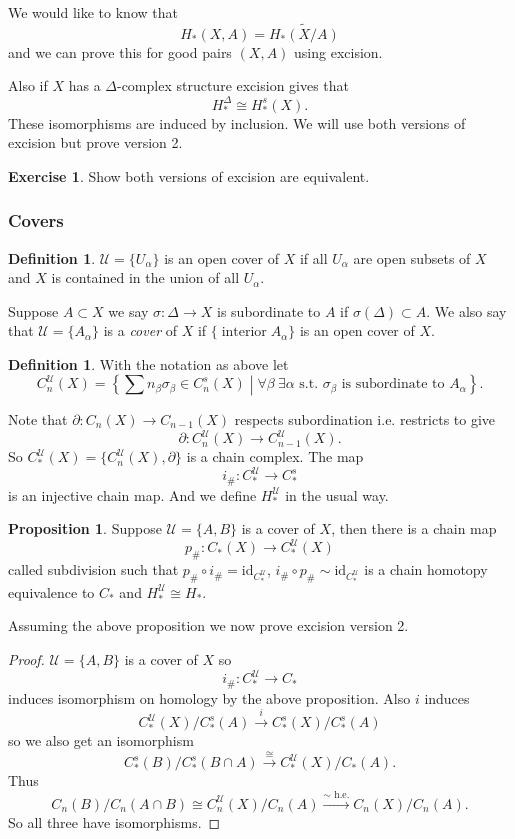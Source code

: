 \documentclass[12pt]{article}
\theoremstyle{definition}
\newtheorem{prop}[thm]{Proposition}
\theoremstyle{definition}
\newtheorem{defn}[thm]{Definition}
\newtheorem*{exer}{Exercise}
\newcommand{\C}{C_*}
\newcommand{\U}{\mathcal{U}}
\renewcommand{\H}{H_*}
\begin{document}
We would like to know that
\[
\H(X,A) = \tilde{\H(X/A)}
\]
and we can prove this for good pairs $(X,A)$ using excision.

Also if $X$ has a $\Delta$-complex structure excision gives that
\[
\H^\Delta \cong \H^s(X).
\]
These isomorphisms are induced by inclusion.
We will use both versions of excision but prove version 2.
\begin{exer}
Show both versions of excision are equivalent.
\end{exer}

\subsubsection{Covers}
\begin{defn}
$\U = \{U_\alpha\}$ is an open cover of $X$ if all $U_\alpha$ are open subsets of $X$ and $X$ is contained in the union of all $U_\alpha$.
\end{defn}

Suppose $A\subset X$ we say $\sigma\colon \Delta \to X$ is subordinate to $A$ if $\sigma(\Delta) \subset A$.
We also say that $\U = \{A_\alpha\}$ is a \emph{cover} of $X$ if $\{\operatorname{interior}A_\alpha\}$ is an open cover of $X$.

\begin{defn}
With the notation as above let
\[
C_n^\U(X) = \left\{ \sum n_\beta \sigma_\beta \in C_n^s(X) \middle| \forall \beta\ \exists \alpha \text{ s.t. } \sigma_\beta \text{ is subordinate to } A_\alpha\right\}.
\]
\end{defn}

Note that $\partial\colon C_n(X) \to C_{n-1}(X)$ respects subordination i.e. restricts to give
\[
\partial\colon C_n^\U (X) \to C_{n-1}^\U(X).
\]
So $\C^\U(X) =\{C_n^\U(X),\partial\}$ is a chain complex.
The map
\[
i_\# \colon \C^\U \to \C^s
\]
is an injective chain map.
And we define $\H^\U$ in the usual way.

\begin{prop}
Suppose $\U = \{A,B\}$ is a cover of $X$, then there is a chain map
\[
p_\# \colon \C(X) \to \C^\U(X)
\]
called subdivision such that $p_\# \circ i_\# = \text{id}_{\C^\U}$, $i_\#\circ p_\# \sim\text{id}_{\C^\U}$ is a chain homotopy equivalence to $\C$ and $\H^\U \cong \H$.
\end{prop}

Assuming the above proposition we now prove excision version 2.
\begin{proof}
$\U = \{A,B\}$ is a cover of $X$ so
\[
i_\# \colon \C^\U \to \C
\]
induces isomorphism on homology by the above proposition.
Also $i$ induces 
\[
\C^\U(X) /\C^s(A) \xrightarrow{i} \C^s(X)/\C^s(A)
\]
so we also get an isomorphism
\[
\C^s(B)/\C^s(B\cap A) \xrightarrow{\cong} \C^\U (X) /\C(A).
\]
Thus 
\[
C_n(B) /C_n(A\cap B) \cong C_n^\U(X)/C_n(A) \xrightarrow{\sim\text{ h.e.}} C_n(X)/C_n(A).
\]
So all three have isomorphisms.
\end{proof}
\end{document}

